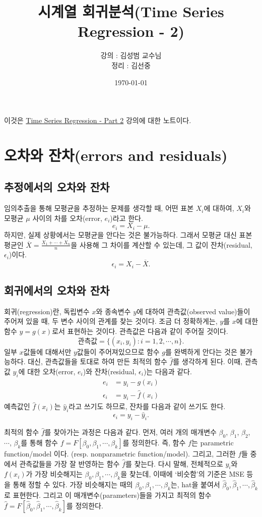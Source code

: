\documentclass{article}
\begin{document}
\title{시계열 회귀분석(Time Series Regression - 2)}
\author{강의 : 김성범 교수님\\ 정리 :  김선중}
\date{\today}
\maketitle

이것은 \href{https://youtu.be/pxG4ZlHJ570}{Time Series Regression - Part 2} 강의에 대한 노트이다.
\tableofcontents

\newpage

\section{오차와 잔차(errors and residuals)}
\subsection{추정에서의 오차와 잔차}
임의추출을 통해 모평균을 추정하는 문제를 생각할 때, 어떤 표본 \(X_i\)에 대하여, \(X_i\)와 모평균 \(\mu\) 사이의 차를 오차(error, \(e_i\))라고 한다.
\[e_i = X_i-\mu.\]
하지만, 실제 상황에서는 모평균을 안다는 것은 불가능하다.
그래서 모평균 대신 표본평균인 \(\overline X = \frac{X_1+\cdots+X_n}n\)을 사용해 그 차이를 계산할 수 있는데, 그 값이 잔차(residual, \(\epsilon_i\))이다.
\[\epsilon_i = X_i-\overline X.\]
\subsection{회귀에서의 오차와 잔차}
회귀(regression)란, 독립변수 \(x\)와 종속변수 \(y\)에 대하여 관측값(observed value)들이 주어져 있을 때, 두 변수 사이의 관계를 찾는 것이다.
조금 더 정확하게는, \(y\)를 \(x\)에 대한 함수 \(y=g(x)\)로서 표현하는 것이다.
관측값은 다음과 같이 주어질 것이다.
\[\text{관측값} = \{(x_i,y_i):i=1,2,\cdots,n\}.\]
일부 \(x\)값들에 대해서만 \(y\)값들이 주어져있으므로 함수 \(g\)를 완벽하게 안다는 것은 불가능하다.
대신, 관측값들을 토대로 하여 만든 최적의 함수 \(\hat f\)를 생각하게 된다.
이때, 관측값 \(y_i\)에 대한 오차(error, \(e_i\))와 잔차(residual, \(\epsilon_i\))는 다음과 같다.
\begin{align}
e_i&=y_i-g(x_i)\label{error}\\
\epsilon_i&=y_i-\hat f(x_i)\label{residual}
\end{align}
예측값인 \(\hat f(x_i)\)는 \(\hat y_i\)라고 쓰기도 하므로, 잔차를 다음과 같이 쓰기도 한다.
\[\epsilon_i=y_i-\hat y_i.\]

최적의 함수 \(\hat f\)를 찾아가는 과정은 다음과 같다.
먼저, 여러 개의 매개변수 \(\beta_0\), \(\beta_1\), \(\beta_2\), \(\cdots\), \(\beta_k\)를 통해 함수 \(f=F[\beta_0,\beta_1,\cdots,\beta_k]\)를 정의한다.
즉, 함수 \(f\)는 parametric function/model 이다. (resp. nonparametric function/model).
그리고, 그러한 \(f\)들 중에서 관측값들을 가장 잘 반영하는 함수 \(\hat f\)를 찾는다.
다시 말해, 전체적으로 \(y_i\)와 \(f(x_i)\)가 가장 비슷해지는 \(\beta_0,\beta_1,\cdots,\beta_k\)을 찾는데, 이때에 `비슷함'의 기준은 MSE 등을 통해 정할 수 있다.
가장 비슷해지는 때의 \(\beta_0,\beta_1,\cdots,\beta_k\)는, hat을 붙여서 \(\hat\beta_0,\hat\beta_1,\cdots,\hat\beta_k\)로 표현한다.
그리고 이 매개변수(parameters)들을 가지고 최적의 함수 \(\hat f =  F[\hat\beta_0,\hat\beta_1,\cdots,\hat\beta_k]\)를 정의한다.
\end{document}
